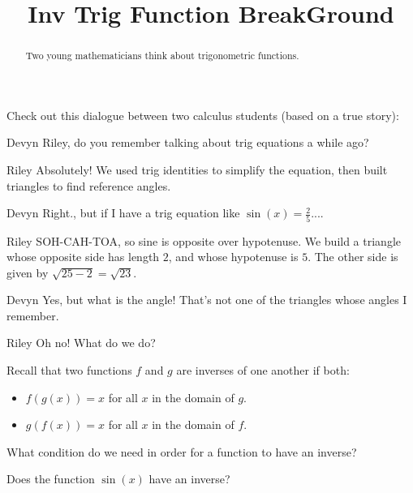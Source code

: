 \documentclass{ximera}
\title[Break-Ground:]{Inv Trig Function BreakGround}
\begin{document}
\begin{abstract}
  Two young mathematicians think about trigonometric functions.
\end{abstract}
\maketitle

Check out this dialogue between two calculus students (based on a true
story):

\begin{dialogue}
\item[Devyn] Riley, do you remember talking about trig equations a while ago?
\item[Riley] Absolutely!  We used trig identities to simplify the equation, then built triangles to find reference angles.
\item[Devyn] Right., but if I have a trig equation like $\displaystyle \sin(x) = \frac{2}{5}$....
\item[Riley] SOH-CAH-TOA, so sine is opposite over hypotenuse.  We build a triangle whose opposite side has length $2$, and whose
	hypotenuse is $5$.  The other side is given by $\sqrt{25-2} = \sqrt{23}$.
\item[Devyn] Yes, but what is the angle!  That's not one of the triangles whose angles I remember.
\item[Riley] Oh no!  What do we do?
\end{dialogue}

\begin{problem}
	Recall that two functions $f$ and $g$ are inverses of one another if both:
	\begin{itemize}
		\item $f\left( g(x) \right) = x$ for all $x$ in the domain of $g$.
		\item $g\left( f(x) \right) = x$ for all $x$ in the domain of $f$.
	\end{itemize}
	What condition do we need in order for a function to have an inverse?
  \begin{selectAll}
  \end{selectAll}
\end{problem}


\begin{problem}
	Does the function $\sin(x)$ have an inverse?
	\begin{multipleChoice}
	  \end{multipleChoice}
\end{problem}
\end{document}
